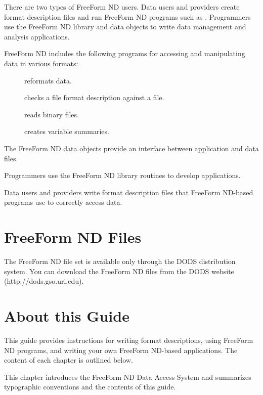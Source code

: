 There are two types of FreeForm ND users. Data users and providers
create format description files and run FreeForm ND programs such as
. Programmers use the FreeForm ND library and data
objects to write data management and analysis applications.

FreeForm ND includes the following programs for accessing and
manipulating data in various formats:

\begin{description}

\item[] reformats data.

\item[] checks a file format description against a file.

\item[] reads binary files.

\item[] creates variable summaries.
\end{description}

The FreeForm ND data objects provide an interface between application
and data files.

Programmers use the FreeForm ND library routines to develop
applications.

Data users and providers write format description files that FreeForm
ND-based programs use to correctly access data.

\section{FreeForm ND Files}

The FreeForm ND file set is available only through the DODS
distribution system. You can download the FreeForm ND files from the
DODS website (http://dods.gso.uri.edu).

\section{About this Guide}

This guide provides instructions for writing format descriptions,
using FreeForm ND programs, and writing your own FreeForm ND-based
applications. The content of each chapter is outlined below.

This chapter introduces the FreeForm ND Data Access System and
summarizes typographic conventions and the contents of this guide.

